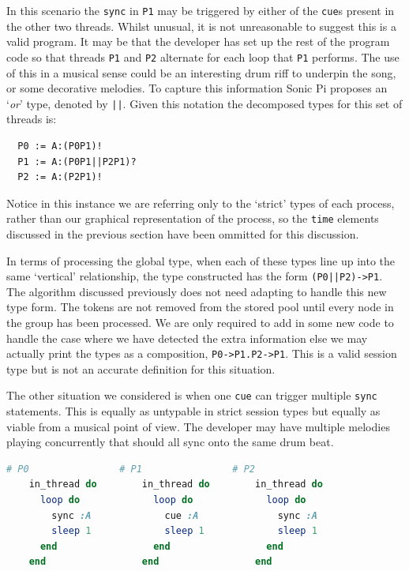 \documentclass[11pt]{scrartcl}
\begin{document}
In this scenario the \texttt{sync} in \texttt{P1} may be triggered by either
of the \texttt{cue}s present in the other two threads. Whilst unusual,
it is not unreasonable to suggest this is a valid program. It may be that the
developer has set up the rest of the program code so that threads \texttt{P1} 
and \texttt{P2} alternate for each loop that \texttt{P1} performs. The use
of this in a musical sense could be an interesting drum riff to underpin the
song, or some decorative melodies. To capture this information Sonic Pi 
proposes an `\emph{or}' type, denoted by \texttt{||}. Given this notation the
decomposed types for this set of threads is:
\\
\begin{lstlisting}
  P0 := A:(P0P1)!
  P1 := A:(P0P1||P2P1)?
  P2 := A:(P2P1)!
\end{lstlisting}

Notice in this instance we are referring only to the `strict' types of each 
process, rather than our graphical representation of the process, so the
\texttt{time} elements discussed in the previous section have been ommitted 
for this discussion.

In terms of processing the global type, when each of these types line up
into the same `vertical' relationship, the type constructed has the form 
\texttt{(P0||P2)->P1}. The algorithm discussed previously does not need
adapting to handle this new type form. The tokens are not removed from the
stored pool until every node in the group has been processed. We are only
required to add in some new code to handle the case where we have detected
the extra information else we may actually print the types as a composition,
\texttt{P0->P1.P2->P1}. This is a valid session type but is not an accurate
definition for this situation.

The other situation we considered is when one \texttt{cue} can trigger
multiple \texttt{sync} statements. This is equally as untypable in strict
session types but equally as viable from a musical point of view. The developer
may have multiple melodies playing concurrently that should all sync onto the
same drum beat.

\begin{minipage}{\textwidth}
	\begin{lstlisting}[language = ruby]
    # P0                # P1                # P2
    in_thread do        in_thread do        in_thread do
      loop do             loop do             loop do
        sync :A             cue :A              sync :A
        sleep 1             sleep 1             sleep 1
      end                 end                 end
    end                 end                 end
	\end{lstlisting}
\end{minipage}
\end{document}
